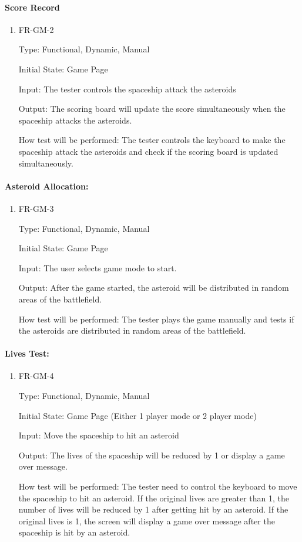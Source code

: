 \documentclass[12pt, titlepage]{article}
\begin{document}
\paragraph{Score Record}
\begin{enumerate}					
\item{FR-GM-2\\}

Type: Functional, Dynamic, Manual
					
Initial State: Game Page
					
Input: The tester controls the spaceship attack the asteroids
					
Output: The scoring board will update the score simultaneously when the spaceship attacks the asteroids. 
	
How test will be performed:  The tester controls the keyboard to make the spaceship attack the asteroids and check if the scoring board is updated simultaneously. 
\end{enumerate}

\paragraph{Asteroid Allocation:}
\begin{enumerate}					
\item{FR-GM-3\\}

Type: Functional, Dynamic, Manual
					
Initial State: Game Page
					
Input: The user selects game mode to start.
					
Output:  After the game started, the asteroid will be distributed in random areas of the battlefield.

How test will be performed:  The tester plays the game manually and tests if the asteroids are distributed in random areas of the battlefield. 
\end{enumerate}

\paragraph{Lives Test:}
\begin{enumerate}					
\item{FR-GM-4\\}

Type: Functional, Dynamic, Manual
					
Initial State: Game Page (Either 1 player mode or 2 player mode)
					
Input: Move the spaceship to hit an asteroid
					
Output:  The lives of the spaceship will be reduced by 1 or display a game over message.

How test will be performed:  The tester need to control the keyboard to move the spaceship to hit an asteroid. If the original lives are greater than 1, the number of lives will be reduced by 1 after getting hit by an asteroid. If the original lives is 1, the screen will display a game over message after the spaceship is hit by an asteroid. 
\end{enumerate}
\end{document}
